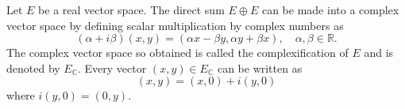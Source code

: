 Let $E$ be a real vector space. The direct sum $E \oplus E$ can be made into a complex vector space by defining scalar multiplication by complex numbers as
$$(\alpha + i\beta)(x, y) = (\alpha x - \beta y, \alpha y + \beta x), \quad \alpha, \beta \in \mathbb{R}.$$
The complex vector space so obtained is called the complexification of $E$ and is denoted by $E_{\mathbb{C}}$.
Every vector $(x, y) \in E_{\mathbb{C}}$ can be written as
$$(x, y) = (x, 0) + i(y, 0)$$
where $i(y, 0) = (0, y)$.
